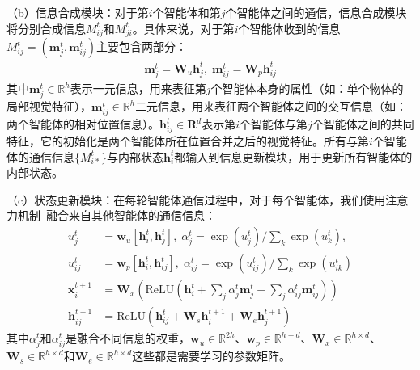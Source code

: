 （b）信息合成模块：对于第$i$个智能体和第$j$个智能体之间的通信，信息合成模块将分别合成信息$M^t_{ij}$和$M^t_{ji}$。具体来说，对于第$i$个智能体收到的信息$M^t_{ij} = (\bm{m}^t_j, \bm{m}^t_{ij})$主要包含两部分：
\begin{equation}
\begin{aligned}
\bm{m}^t_j = \bm{W}_u \bm{h}^t_j, \; \bm{m}^t_{ij} = \bm{W}_p\bm{h}^t_{ij}
\end{aligned}
\end{equation}
其中$\bm{m}^t_j \in \mathbb{R}^h$表示一元信息，用来表征第$j$个智能体本身的属性（如：单个物体的局部视觉特征），$\bm{m}^t_{ij} \in \mathbb{R}^h$二元信息，用来表征两个智能体之间的交互信息（如：两个智能体的相对位置信息）。$\bm{h}^t_{ij} \in \bm{R}^d$表示第$i$个智能体与第$j$个智能体之间的共同特征，它的初始化是两个智能体所在位置合并之后的视觉特征。所有与第$i$个智能体的通信信息$\{M^t_{i*}\}$与内部状态$\bm{h}^t_i$都输入到信息更新模块，用于更新所有智能体的内部状态。

（c）状态更新模块：在每轮智能体通信过程中，对于每个智能体，我们使用注意力机制~\cite{chen2017sca}融合来自其他智能体的通信信息：
\begin{equation}
\begin{aligned}
    u^t_j &= \bm{w}_u [\bm{h}^t_i, \bm{h}^t_j],\; \alpha^t_j = \exp(u^t_j) / \textstyle{\sum_k} \exp(u^t_k), \\
    u^t_{ij} &= \bm{w}_p [\bm{h}^t_i, \bm{h}^t_{ij}],\; \alpha^t_{ij} = \exp(u^t_{ij}) / \textstyle{\sum_k} \exp(u^t_{ik}) \\
    \bm{x}^{t+1}_i &= \bm{W}_x (\text{ReLU} (\bm{h}^t_i + \textstyle{\sum_j} \alpha^t_j \bm{m}^t_j +  \textstyle{\sum_j} \alpha^t_{ij} \bm{m}^t_{ij})) \\
    \bm{h}^{t+1}_{ij} &= \text{ReLU} (\bm{h}^t_{ij} + \bm{W}_s \bm{h}^{t+1}_i + \bm{W}_e \bm{h}^{t+1}_j)
\end{aligned}
\end{equation}
其中$\alpha^t_j$和$\alpha^t_{ij}$是融合不同信息的权重，$\bm{w}_u \in \mathbb{R}^{2h}$、$\bm{w}_p \in \mathbb{R}^{h+d}$、$\bm{W}_x \in \mathbb{R}^{h\times d}$、$\bm{W}_s \in \mathbb{R}^{h\times d}$和$\bm{W}_e \in \mathbb{R}^{h\times d}$这些都是需要学习的参数矩阵。


